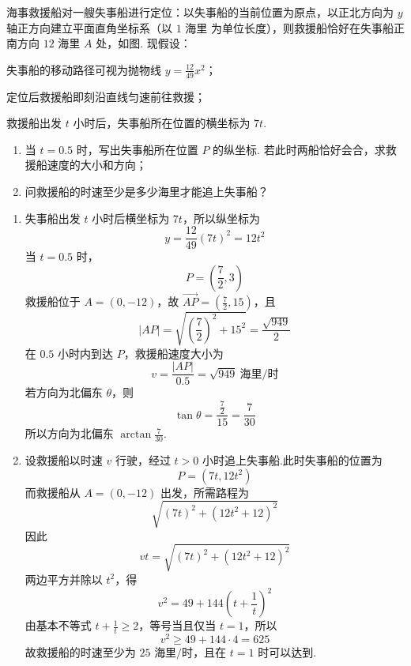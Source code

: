 \begin{problem}
海事救援船对一艘失事船进行定位：以失事船的当前位置为原点，以正北方向为 \(y\) 轴正方向建立平面直角坐标系（以 \(1\text{ 海里}\) 为单位长度），则救援船恰好在失事船正南方向 \(12\text{ 海里}\) \(A\) 处，如图. 现假设：

\begin{circlelist}
\item 失事船的移动路径可视为抛物线 \(y = \frac{12}{49} x^2\)；
\item 定位后救援船即刻沿直线匀速前往救援；
\item 救援船出发 \(t\) 小时后，失事船所在位置的横坐标为 \(7t\).
\end{circlelist}

\begin{enumerate}
\item 当 \(t = 0.5\) 时，写出失事船所在位置 \(P\) 的纵坐标. 若此时两船恰好会合，求救援船速度的大小和方向；
\item 问救援船的时速至少是多少海里才能追上失事船？
\end{enumerate}

\end{problem}

\begin{solution}
\begin{enumerate}
\item 失事船出发 \(t\) 小时后横坐标为 \(7t\)，所以纵坐标为
\[
y=\frac{12}{49}(7t)^2=12t^2
\]
当 \(t=0.5\) 时，
\[
P=\left(\frac72,3\right)
\]
救援船位于 \(A=(0,-12)\)，故 \(\overrightarrow{AP}=\left(\frac72,15\right)\)，且
\[
|AP|=\sqrt{\left(\frac72\right)^2+15^2}=\frac{\sqrt{949}}2
\]
在 \(0.5\) 小时内到达 \(P\)，救援船速度大小为
\[
v=\frac{|AP|}{0.5}=\sqrt{949}\ \text{海里/时}
\]
若方向为北偏东 \(\theta\)，则
\[
\tan\theta=\frac{\frac{7}{2}}{15}=\frac7{30}
\]
所以方向为北偏东 \(\arctan\frac7{30}\).

\item 设救援船以时速 \(v\) 行驶，经过 \(t>0\) 小时追上失事船.此时失事船的位置为
\[
P=(7t,12t^2)
\]
而救援船从 \(A=(0,-12)\) 出发，所需路程为
\[
\sqrt{(7t)^2+(12t^2+12)^2}
\]
因此
\[
vt=\sqrt{(7t)^2+(12t^2+12)^2}
\]
两边平方并除以 \(t^2\)，得
\[
v^2=49+144\left(t+\frac1t\right)^2
\]
由基本不等式 \(t+\frac1t\geqslant2\)，等号当且仅当 \(t=1\)，所以
\[
v^2\geqslant49+144\cdot4=625
\]
故救援船的时速至少为 \(25\text{ 海里/时}\)，且在 \(t=1\) 时可以达到.
\end{enumerate}
\end{solution}

